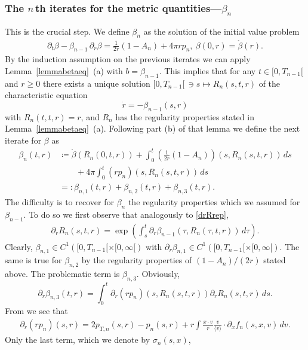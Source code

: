 \documentclass[11pt]{article}
\def\p0{\langle v \rangle}
\begin{document}
\subsubsection{The $n\,$th iterates for the metric quantities---$\beta_n$}
\label{beta_nsection}
%
%
This is the crucial step.
We define $\beta_n$ as
the solution of the initial value problem
\begin{align}\label{betaeq}
 \partial_t\beta-\beta_{n-1}\, \partial_r\beta =
 \frac{1}{2r}(1-A_n)+4\pi r p_n,\ 
\beta(0,r) =\mathring{\beta}(r).
\end{align}
By the induction assumption on the previous iterates
we can apply Lemma~\ref{lemmabetaeq}~(a) with
$b=\beta_{n-1}$.
This implies that for any $t\in [0,T_{n-1}[$ and $r\geq 0$
there exists a unique solution
$[0,T_{n-1}[\,\ni s\mapsto R_n(s,t,r)$ of the characteristic equation
\[
\dot r = - \beta_{n-1}(s,r)
\]
with $R_n(t,t,r)=r$, and $R_n$ has the regularity properties stated
in Lemma~\ref{lemmabetaeq}~(a).
Following part (b) of that lemma we define the next iterate for $\beta$ as
\begin{align}\label{betandef}
  \beta_n(t,r)
  &\coloneqq
  \mathring{\beta}(R_n(0,t,r)) +
  \int_0^t\left(\frac{1}{2r}(1-A_n)\right)(s,R_n(s,t,r))\, ds
  \nonumber\\
  & \qquad {}
  + 4\pi \int_0^t(r p_n)(s,R_n(s,t,r))\, ds\nonumber\\
  &=:
  \beta_{n,1}(t,r) + \beta_{n,2}(t,r) + \beta_{n,3}(t,r).
\end{align}
The difficulty is to recover for $\beta_n$ the regularity properties
which we assumed for $\beta_{n-1}$. To do so we first observe that analogously
to \eqref{drRrep},
\begin{align}\label{drRnrep}
\partial_r R_n(s,t,r) =
\exp\left(\int_s^t \partial_r\beta_{n-1}(\tau,R_n(\tau,t,r))\,d\tau\right).
\end{align}
Clearly,
$\beta_{n,1}\in C^1([0,T_{n-1}[ \times [0,\infty[)$ with 
$\partial_r \beta_{n,1}\in C^1([0,T_{n-1}[ \times [0,\infty[)$.
The same is true for $\beta_{n,2}$ by the regularity properties
of  $(1-A_n)/(2r)$ stated above.
The problematic term is $\beta_{n,3}$. 
Obviously,
\[
\partial_r \beta_{n,3}(t,r) = \int_0^t \partial_r (r p_n)(s,R_n(s,t,r))
\partial_r R_n(s,t,r)\, ds.
\]
From \cite[p.~98]{GB} we see that
\begin{align}\label{pr}
\partial_r (r p_n)(s,r) = 2 p_{T,n}(s,r) - p_n(s,r)
+ r \int \frac{x\cdot v}{r} \frac{v}{\p0} \cdot \partial_x f_n(s,x,v)\, dv.
\end{align}
Only the last term, which we denote by $\sigma_n(s,x)$,
\end{document}
